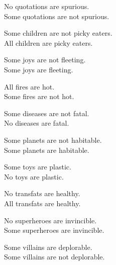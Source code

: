 \begin{exercises}

\item No quotations are spurious.  \\
	Some quotations are not spurious.  

\item Some children are not picky eaters.  \\
	All children are picky eaters. \answer{\\Contradictories}

\item Some joys are not fleeting.  \\
	Some joys are fleeting.  \answer{\\Subcontraries}

\item All fires are hot.  \\
	Some fires are not hot.  \answer{\\Contradictories}

\item Some diseases are not fatal.  \\
	No diseases are fatal.  

\item Some planets are not habitable.  \\
	Some planets are habitable. \answer{\\Subcontraries}

\item Some toys are plastic.  \\
	No toys are plastic.   \answer{\\Contradictories}

\item No transfats are healthy.  \\
	All transfats are healthy.  \answer{\\Contraries}

\item No superheroes are invincible.   \\
	Some superheroes are invincible. \answer{\\Contradictories}

\item Some villains are deplorable.  \\
	Some villains are not deplorable.  \answer{\\Subcontraries}

\end{exercises}

